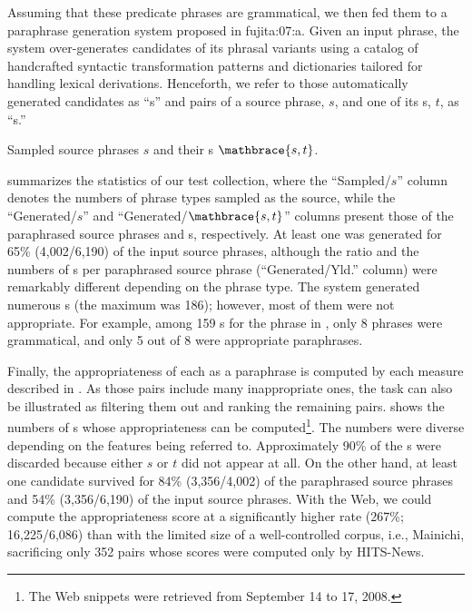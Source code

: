 \documentclass[english]{jnlp_1.4}
\renewcommand{\cite}{}
\begin{document}
Assuming that these predicate phrases are grammatical, we then fed
them to a paraphrase generation system proposed in \cite{fujita:07:a}.
Given an input phrase, the system over-generates candidates of its
phrasal variants using a catalog of handcrafted syntactic
transformation patterns and dictionaries tailored for handling lexical
derivations.
Henceforth, we refer to those automatically generated candidates as
``{\pc}s'' and pairs of a source phrase, $s$, and one of its {\pc}s,
$t$, as ``{\pcp}s.''

\begin{table}[t]
\caption{Sampled source phrases $s$ and their {\pcp}s $\mathbrace{s,t}$.}
\label{tab:generated}

\end{table}

 summarizes the statistics of our test collection,
where the ``Sampled/$s$'' column denotes the numbers of phrase types
sampled as the source, while the ``Generated/$s$'' and
``Generated/$\mathbrace{s,t}$'' columns present those of the
paraphrased source phrases and {\pcp}s, respectively.
At least one {\pc} was generated for 65\% (4,002/6,190) of the input
source phrases, although the ratio and the numbers of {\pc}s per
paraphrased source phrase (``Generated/Yld.'' column) were remarkably
different depending on the phrase type.
The system generated numerous {\pc}s (the maximum was 186); however,
most of them were not appropriate.  For example, among 159 {\pc}s for
the phrase in , only 8 phrases were grammatical,
and only 5 out of 8 were appropriate paraphrases.

Finally, the appropriateness of each {\pcp} as a paraphrase is
computed by each measure described in .
As those pairs include many inappropriate ones, the task can also be
illustrated as filtering them out and ranking the remaining pairs.
 shows the numbers of {\pcp}s whose appropriateness can
be computed\footnote{The Web snippets were retrieved from September 14
  to 17, 2008.}.  The numbers were diverse depending on the features
being referred to.
Approximately 90\% of the {\pcp}s were discarded because either $s$ or
$t$ did not appear at all.  On the other hand, at least one candidate
survived for 84\% (3,356/4,002) of the paraphrased source phrases and
54\% (3,356/6,190) of the input source phrases.
With the Web, we could compute the appropriateness score at a
significantly higher rate (267\%; 16,225/6,086) than with the limited
size of a well-controlled corpus, i.e., Mainichi, sacrificing only 352
pairs whose scores were computed only by HITS-News.
\end{document}
